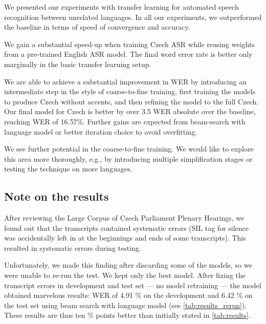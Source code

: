 We presented our experiments with transfer learning for automated speech recognition between unrelated languages.
In all our experiments, we outperformed the baseline in terms of speed of convergence and accuracy.

We gain a substantial speed-up when training Czech ASR while reusing weights from a pre-trained English ASR model. The final word error rate is better only marginally in the basic transfer learning setup.

We are able to achieve a substantial improvement in WER by introducing an intermediate step in the style of coarse-to-fine training, first training the models to produce Czech without accents, and then refining the model to the full Czech.
Our final model for Czech is better by over 3.5 WER absolute over the baseline, reaching WER of 16.57\%. Further gains are expected from beam-search with language model or better iteration choice to avoid overfitting.


We see further potential in the coarse-to-fine training. We would like to explore this area more thoroughly, e.g., by introducing multiple simplification stages or testing the technique on more languages.


\subsection{Note on the results}
After reviewing the Large Corpus of Czech Parliament Plenary Hearings, we found out that the transcripts contained systematic errors (SIL tag for silence was accidentally left in at the beginnings and ends of some transcripts). This resulted in systematic errors during testing. 

Unfortunately, we made this finding after discarding some of the models, so we were unable to re-run the test. We kept only the best model. After fixing the transcript errors in development and test set --- no model retraining --- the model obtained marvelous results: WER of 4.91 \% on the development and 6.42 \% on the test set using beam search with language model (see \cref{tab:results_rerun}). These results are thus ten \% points better than initially stated in \cref{tab:results}.

